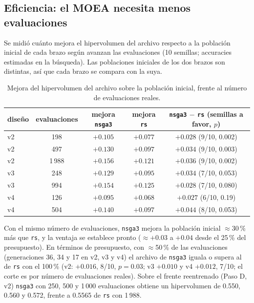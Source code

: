 \documentclass[11pt,a4paper]{article}
\begin{document}
\subsection*{Eficiencia: el MOEA necesita menos evaluaciones}
Se midió cuánto mejora el hipervolumen del archivo respecto a la población inicial de cada brazo según avanzan las evaluaciones (10 semillas; accuracies estimadas en la búsqueda). Las poblaciones iniciales de los dos brazos son distintas, así que cada brazo se compara con la suya.
\begin{table}[h]
\centering\footnotesize
\begin{tabular}{lcccc}
\toprule
diseño & evaluaciones & mejora \texttt{nsga3} & mejora \texttt{rs} & \texttt{nsga3} $-$ \texttt{rs} (semillas a favor, $p$)\\
\midrule
v2 & 198 & $+0.105$ & $+0.077$ & $+0.028$ (9/10, 0.002)\\
v2 & 497 & $+0.130$ & $+0.097$ & $+0.034$ (9/10, 0.003)\\
v2 & 1\,988 & $+0.156$ & $+0.121$ & $+0.036$ (9/10, 0.002)\\
v3 & 248 & $+0.129$ & $+0.095$ & $+0.034$ (7/10, 0.053)\\
v3 & 994 & $+0.154$ & $+0.125$ & $+0.028$ (7/10, 0.080)\\
v4 & 126 & $+0.095$ & $+0.068$ & $+0.027$ (6/10, 0.19)\\
v4 & 504 & $+0.140$ & $+0.097$ & $+0.044$ (8/10, 0.053)\\
\bottomrule
\end{tabular}
\caption{Mejora del hipervolumen del archivo sobre la población inicial, frente al número de evaluaciones reales.}
\label{tab:eficiencia}
\end{table}
Con el mismo número de evaluaciones, \texttt{nsga3} mejora la población inicial $\approx$30\,\% más que \texttt{rs}, y la ventaja se establece pronto ($\approx+0.03$ a $+0.04$ desde el 25\,\% del presupuesto). En términos de presupuesto, con $\approx$50\,\% de las evaluaciones (generaciones 36, 34 y 17 en v2, v3 y v4) el archivo de \texttt{nsga3} iguala o supera al de \texttt{rs} con el 100\,\% (v2: $+0.016$, 8/10, $p=0.03$; v3 $+0.010$ y v4 $+0.012$, 7/10; el corte es por número de evaluaciones reales). Sobre el frente reentrenado (Paso D, v2) \texttt{nsga3} con 250, 500 y 1\,000 evaluaciones obtiene un hipervolumen de 0.550, 0.560 y 0.572, frente a 0.5565 de \texttt{rs} con 1\,988.
\end{document}
